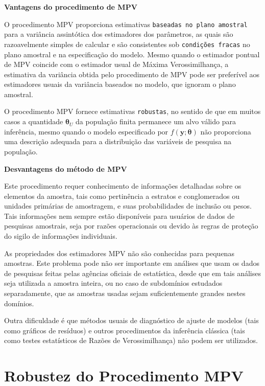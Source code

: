 \documentclass[]{book}
\numberwithin{example}{chapter}
\numberwithin{remark}{chapter}
\numberwithin{definition}{chapter}
\begin{document}
\textbf{Vantagens do procedimento de MPV}

O procedimento MPV proporciona estimativas
\texttt{baseadas\ no\ plano\ amostral} para a variância assintótica dos
estimadores dos parâmetros, as quais são razoavelmente simples de
calcular e são consistentes sob \texttt{condições\ fracas} no plano
amostral e na especificação do modelo. Mesmo quando o estimador pontual
de MPV coincide com o estimador usual de Máxima Verossimilhança, a
estimativa da variância obtida pelo procedimento de MPV pode ser
preferível aos estimadores usuais da variância baseados no modelo, que
ignoram o plano amostral.

O procedimento MPV fornece estimativas \texttt{robustas}, no sentido de
que em muitos casos a quantidade \(\mathbf{\theta }_{U}\) da população
finita permanece um alvo válido para inferência, mesmo quando o modelo
especificado por \(f\left( \mathbf{y};\mathbf{\theta }\right)\) não
proporciona uma descrição adequada para a distribuição das variáveis de
pesquisa na população.

\textbf{Desvantagens do método de MPV}

Este procedimento requer conhecimento de informações detalhadas sobre os
elementos da amostra, tais como pertinência a estratos e conglomerados
ou unidades primárias de amostragem, e suas probabilidades de inclusão
ou pesos. Tais informações nem sempre estão disponíveis para usuários de
dados de pesquisas amostrais, seja por razões operacionais ou devido às
regras de proteção do sigilo de informações individuais.

As propriedades dos estimadores MPV não são conhecidas para pequenas
amostras. Este problema pode não ser importante em análises que usam os
dados de pesquisas feitas pelas agências oficiais de estatística, desde
que em tais análises seja utilizada a amostra inteira, ou no caso de
subdomínios estudados separadamente, que as amostras usadas sejam
suficientemente grandes nestes domínios.

Outra dificuldade é que métodos usuais de diagnóstico de ajuste de
modelos (tais como gráficos de resíduos) e outros procedimentos da
inferência clássica (tais como testes estatísticos de Razões de
Verossimilhança) não podem ser utilizados.

\section{Robustez do Procedimento
MPV}\label{robustez-do-procedimento-mpv}
\end{document}
